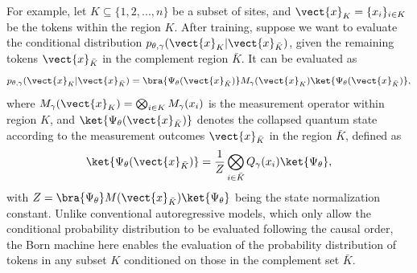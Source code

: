 For example, let $K\subseteq\{1,2,...,n\}$ be a subset of sites, and $\vect{x}_{K}=\{x_i\}_{i\in K}$ be the tokens within the region $K$. After training, suppose we want to evaluate the conditional distribution $p_{\theta,\gamma}(\vect{x}_K|\vect{x}_{\bar{K}})$, given the remaining tokens $\vect{x}_{\bar{K}}$ in the complement region $\bar{K}$. It can be evaluated as
\begin{equation}\label{eq: single site}
    p_{\theta,\gamma}(\vect{x}_K|\vect{x}_{\bar{K}})=\bra{\Psi_\theta(\vect{x}_{\bar{K}})}M_{\gamma}(\vect{x}_K)\ket{\Psi_\theta(\vect{x}_{\bar{K}})},
\end{equation}
where $M_{\gamma}(\vect{x}_K)=\bigotimes_{i\in K}M_{\gamma}(x_i)$ is the measurement operator within region $K$, and $\ket{\Psi_\theta(\vect{x}_{\bar{K}})}$ denotes the collapsed quantum state according to the measurement outcomes $\vect{x}_{\bar{K}}$ in the region $\bar{K}$, defined as
\begin{equation}
\ket{\Psi_\theta(\vect{x}_{\bar{K}})}=\frac{1}{Z}\bigotimes_{i\in\bar{K}}Q_{\gamma}(x_i)\ket{\Psi_{\theta}},
\end{equation}
with $Z=\bra{\Psi_\theta}M(\vect{x}_{\bar{K}})\ket{\Psi_\theta}$ being the state normalization constant.
Unlike conventional autoregressive models, which only allow the conditional probability distribution to be evaluated following the causal order, the Born machine here enables the evaluation of the probability distribution of tokens in any subset $K$ conditioned on those in the complement set $\bar{K}$. 
